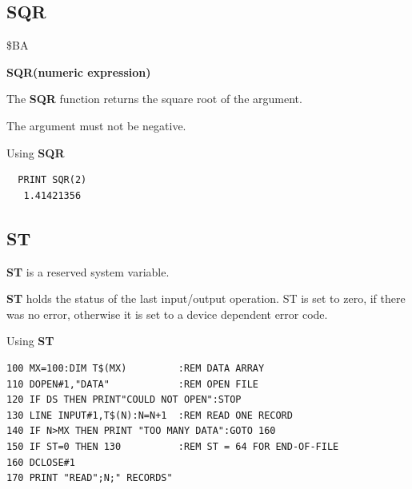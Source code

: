 \subsection{SQR}
\begin{description}[leftmargin=2cm,style=nextline]
\item [Token:] \$BA
\item [Format:] {\bf SQR(numeric expression)}
\item [Usage:] The {\bf SQR} function returns the square root
               of the argument.

\item [Remarks:] The argument must not be negative.
\item [Example:] Using {\bf SQR}
\begin{tcolorbox}[colback=black,coltext=white]
\verbatimfont{\codefont}
\begin{verbatim}
  PRINT SQR(2)
   1.41421356
\end{verbatim}
\end{tcolorbox}
\end{description}


\newpage
\subsection{ST}
\begin{description}[leftmargin=2cm,style=nextline]
\item [Format:] {\bf ST} is a reserved system variable.
\item [Usage:]  {\bf ST} holds the status of the last input/output operation.
                ST is set to zero, if there was no error, otherwise
                it is set to a device dependent error code.

\item [Example:] Using {\bf ST}
\begin{tcolorbox}[colback=black,coltext=white]
\verbatimfont{\codefont}
\begin{verbatim}
100 MX=100:DIM T$(MX)         :REM DATA ARRAY
110 DOPEN#1,"DATA"            :REM OPEN FILE
120 IF DS THEN PRINT"COULD NOT OPEN":STOP
130 LINE INPUT#1,T$(N):N=N+1  :REM READ ONE RECORD
140 IF N>MX THEN PRINT "TOO MANY DATA":GOTO 160
150 IF ST=0 THEN 130          :REM ST = 64 FOR END-OF-FILE
160 DCLOSE#1
170 PRINT "READ";N;" RECORDS"
\end{verbatim}
\end{tcolorbox}
\end{description}

